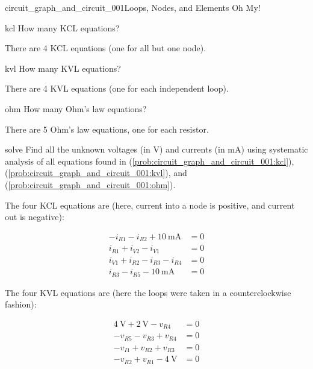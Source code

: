\begin{mainquestion}{circuit_graph_and_circuit_001}{Loops, Nodes, and Elements Oh My!}
\begin{partquestion}{kcl}
{How many KCL equations?}
\begin{answer}
    There are 4 KCL equations (one for all but one node).
\end{answer}
\end{partquestion}

\begin{partquestion}{kvl}
{How many KVL equations?}
\begin{answer}
There are 4 KVL equations (one for each independent loop).
\end{answer}
\end{partquestion}

\begin{partquestion}{ohm}
{How many Ohm’s law equations?}
\begin{answer}
There are 5 Ohm’s law equations, one for each resistor.
\end{answer}
\end{partquestion}

\begin{partquestion}{solve}
{Find all the unknown voltages (in \unit{\volt}) and currents (in \unit{\milli\ampere}) using systematic analysis of all equations found in (\cref{prob:circuit_graph_and_circuit_001:kcl}), (\cref{prob:circuit_graph_and_circuit_001:kvl}), and (\cref{prob:circuit_graph_and_circuit_001:ohm}).}

\begin{answer}

The four KCL equations are (here, current into a node is positive, and current out is negative):

\begin{align}
-i_{R1}-i_{R2}+\qty{10}{\milli\ampere} &= 0 \\
i_{R1}+i_{V2}-i_{V1} &= 0 \\
i_{V1}+i_{R2}-i_{R3}-i_{R4} &= 0 \\
i_{R3}-i_{R5}-\qty{10}{\milli\ampere} &= 0
\end{align}

The four KVL equations are (here the loops were taken in a counterclockwise fashion):

\begin{align}
\qty{4}{\volt}+\qty{2}{\volt}-v_{R4} &= 0 \\
-v_{R5}-v_{R3}+v_{R4} &= 0 \\
-v_{I1}+v_{R2}+v_{R3} &= 0 \\
-v_{R2}+v_{R1}-\qty{4}{\volt} &= 0
\end{align}


\end{answer}
\end{partquestion}
\end{mainquestion}
